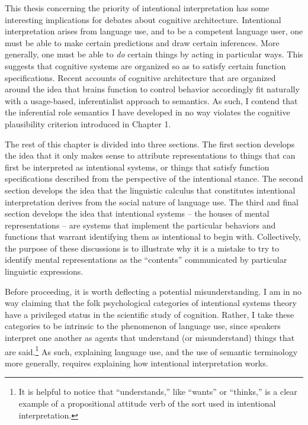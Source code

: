 This thesis concerning the priority of intentional interpretation has some interesting implications for debates about cognitive architecture. Intentional interpretation arises from language use, and to be a competent language user, one must be able to make certain predictions and draw certain inferences. More generally, one must be able to \textit{do} certain things by acting in particular ways. This suggests that cognitive systems are organized so as to satisfy certain function specifications. Recent accounts of cognitive architecture that are organized around the idea that brains function to control behavior \citep[e.g.,][]{Eliasmith:2003,Eliasmith:2013} accordingly fit naturally with a usage-based, inferentialist approach to semantics. As such, I contend that the inferential role semantics I have developed in no way violates the cognitive plausibility criterion introduced in Chapter 1.  

The rest of this chapter is divided into three sections. The first section develops the idea that it only makes sense to attribute representations to things that can first be interpreted as intentional systems, or things that satisfy function specifications described from the perspective of the intentional stance. The second section develops the idea that the linguistic calculus that constitutes intentional interpretation derives from the social nature of language use. The third and final section develops the idea that intentional systems -- the houses of mental representations -- are systems that implement the particular behaviors and functions that warrant identifying them as intentional to begin with. Collectively, the purpose of these discussions is to illustrate why it is a mistake to try to identify mental representations as the ``contents'' communicated by particular linguistic expressions.

Before proceeding, it is worth deflecting a potential misunderstanding. I am in no way claiming that the folk psychological categories of intentional systems theory have a privileged status in the scientific study of cognition. Rather, I take these categories to be intrinsic to the phenomenon of language use, since speakers interpret one another as agents that understand (or misunderstand) things that are said.\footnote{It is helpful to notice that ``understands,'' like ``wants'' or ``thinks,'' is a clear example of a propositional attitude verb of the sort used in intentional interpretation.} As such, explaining language use, and the use of semantic terminology more generally, requires explaining how intentional interpretation works.

